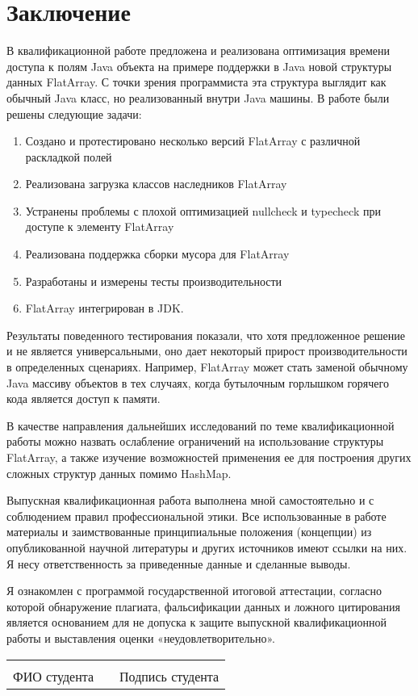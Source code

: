 \section{Заключение}
В квалификационной работе предложена и реализована оптимизация времени доступа к полям Java
объекта на примере поддержки в Java новой структуры данных FlatArray. С точки зрения
программиста эта структура выглядит как обычный Java класс, но реализованный внутри Java машины.
В работе были решены следующие задачи:
\begin{enumerate}
	\item Создано и протестировано несколько версий FlatArray с различной раскладкой полей
	\item Реализована загрузка классов наследников FlatArray
	\item Устранены проблемы с плохой оптимизацией nullcheck и typecheck при доступе к элементу FlatArray
	\item Реализована поддержка сборки мусора для FlatArray
	\item Разработаны и измерены тесты производительности 
	\item FlatArray интегрирован в JDK.
\end{enumerate}

Результаты поведенного тестирования показали, что хотя предложенное решение и не является универсальными,
оно дает некоторый прирост производительности в определенных сценариях. Например, FlatArray
может стать заменой обычному Java массиву объектов в тех случаях, когда бутылочным горлышком
горячего кода является доступ к памяти.

В качестве направления дальнейших исследований по теме квалификационной работы можно назвать
ослабление ограничений на использование структуры FlatArray, а также изучение возможностей
применения ее для построения других сложных структур данных помимо HashMap.  

Выпускная квалификационная работа выполнена мной самостоятельно и с соблюдением правил профессиональной этики. Все использованные в работе материалы и заимствованные принципиальные положения (концепции) из опубликованной научной литературы и других источников имеют ссылки на них. Я несу ответственность за приведенные данные и сделанные выводы.

Я ознакомлен с программой государственной итоговой аттестации, согласно которой обнаружение плагиата, фальсификации данных и ложного цитирования является основанием для не допуска к защите выпускной квалификационной работы и выставления оценки «неудовлетворительно».

\begin{tabular}{lp{2em}l} 
	\hspace{5cm}   && \hspace{4cm} \\ \cline{1-1}\cline{3-3} 
	ФИО студента   && Подпись студента
\end{tabular}

\clearpage
